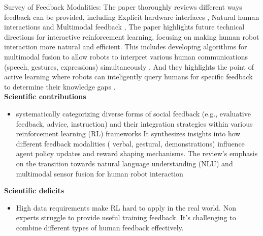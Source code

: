 \documentclass[report.tex]{subfiles}
\begin{document}
Survey of Feedback Modalities: The paper thoroughly reviews different ways feedback can be provided, including Explicit hardware interfaces , Natural human interactions and Multimodal feedback , The paper highlights future technical directions for interactive reinforcement learning, focusing on making human robot interaction more natural and efficient. This includes developing algorithms for multimodal fusion to allow robots to interpret various human communications (speech, gestures, expressions) simultaneously . And they highlights the point of active learning where robots can inteligently query humans for specific feedback to determine their knowledge gaps .\\



\noindent\textbf{Scientific contributions} 
\begin{itemize}
        \item systematically categorizing diverse forms of social feedback (e.g., evaluative feedback, advice, instruction) and their integration strategies within various reinforcement learning (RL) frameworks
 It synthesizes insights into how different feedback modalities ( verbal, gestural, demonstrations) influence agent policy updates and reward shaping mechanisms. The review's emphasis on the transition towards natural language understanding (NLU) and multimodal sensor fusion for human robot interaction
        
\end{itemize}

\noindent\textbf{Scientific deficits} 
\begin{itemize}
        \item High data requirements make RL hard to apply in the real world.
 Non experts struggle to provide useful training feedback.
 It's challenging to combine different types of human feedback effectively.
        
       
\end{itemize}
\end{document}
